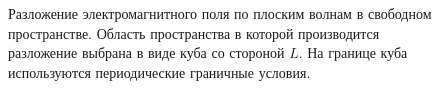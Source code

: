 \begin{figure}
\centering

\caption{Разложение электромагнитного поля по плоским волнам в свободном
  пространстве. Область пространства в которой производится разложение
  выбрана в виде куба со стороной
  $L$. На границе куба используются периодические граничные условия.}
\label{figCh1_Vfree}
\end{figure}
